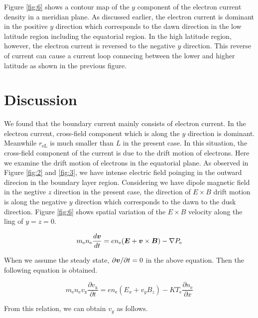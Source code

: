 \documentclass{EPS}
\newcommand{\bvec}[1]{\mbox{\boldmath $#1$}}
\begin{document}
Figure \ref{fig:6} shows a contour map of the $y$ component of the electron current density in a meridian plane.
As discussed earlier, the electron current is dominant in the positive $y$ direction which corresponds to the
dawn direction in the low latitude region including the equatorial region.
In the high latitude region, however, the electron current is reversed to the negative $y$ direction. 
This reverse of current can cause a current loop connecing between the lower and higher latitude 
as shown in the previous figure.  

\section{Discussion}

We found that the boundary current mainly consists of electron current. 
In the electron current, cross-field component which is along the $y$ direction is dominant. 
Meanwhile $r_\mathrm{eL}$ is much smaller than $L$ in the present case. 
In this situation, the cross-field component of the current is due to the drift motion of electrons.
Here we examine the drift motion of electrons in the equatorial plane. 
As observed in Figure \ref{fig:2} and \ref{fig:3}, we have intense electric field poinging in the outward direcion
in the boundary layer region. 
Considering we have dipole magnetic field in the negtive $z$ direction in the present case, 
the direction of $E \times B$ drift motion is along the negative $y$ direction which corresponds to the 
dawn to the dusk direction.  
Figure \ref{fig:6} shows spatial variation of the $E \times B$ velocity along the ling of $y=z=0$. 
 
\begin{linenomath}
 \begin{equation}
  m_\mathrm{e} n_\mathrm{e} \frac{d \bvec{v}}{dt}
    = en_\mathrm{e}(\bvec{E} + \bvec{v} \times \bvec{B}) - \nabla P_\mathrm{e}
 \end{equation}
\end{linenomath}

When we assume the steady state, $\partial{\bvec{v}}/\partial{t} = 0 $ in the above equation. Then 
the following equation is obtained.

\begin{linenomath}
 \begin{equation}
  m_\mathrm{e} n_\mathrm{e} v_\mathrm{x} \frac{\partial v_\mathrm{x}}{\partial t}
    = en_\mathrm{e} (E_x + v_y B_z) -  K T_\mathrm{e} \frac{\partial n_\mathrm{e}} {\partial x}
 \end{equation}
\end{linenomath}
From this relation, we can obtain $v_y$ as follows.
\end{document}
